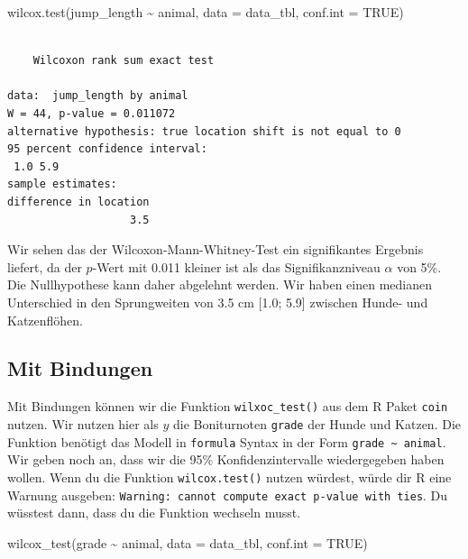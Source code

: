\documentclass[
  letterpaper,
]{scrbook}
\newenvironment{Shaded}{\begin{snugshade}}{\end{snugshade}}
\newcommand{\AttributeTok}[1]{\textcolor[rgb]{0.40,0.45,0.13}{#1}}
\newcommand{\ConstantTok}[1]{\textcolor[rgb]{0.56,0.35,0.01}{#1}}
\newcommand{\FunctionTok}[1]{\textcolor[rgb]{0.28,0.35,0.67}{#1}}
\newcommand{\NormalTok}[1]{\textcolor[rgb]{0.00,0.23,0.31}{#1}}
\newcommand{\SpecialCharTok}[1]{\textcolor[rgb]{0.37,0.37,0.37}{#1}}
\begin{document}
\begin{Shaded}
\begin{Highlighting}[]
\FunctionTok{wilcox.test}\NormalTok{(jump\_length }\SpecialCharTok{\textasciitilde{}}\NormalTok{ animal, }\AttributeTok{data =}\NormalTok{ data\_tbl, }
            \AttributeTok{conf.int =} \ConstantTok{TRUE}\NormalTok{)}
\end{Highlighting}
\end{Shaded}

\begin{verbatim}

    Wilcoxon rank sum exact test

data:  jump_length by animal
W = 44, p-value = 0.011072
alternative hypothesis: true location shift is not equal to 0
95 percent confidence interval:
 1.0 5.9
sample estimates:
difference in location 
                   3.5 
\end{verbatim}

Wir sehen das der Wilcoxon-Mann-Whitney-Test ein signifikantes Ergebnis
liefert, da der \(p\)-Wert mit 0.011 kleiner ist als das
Signifikanzniveau \(\alpha\) von 5\%. Die Nullhypothese kann daher
abgelehnt werden. Wir haben einen medianen Unterschied in den
Sprungweiten von 3.5 cm {[}1.0; 5.9{]} zwischen Hunde- und Katzenflöhen.

\hypertarget{mit-bindungen}{%
\subsection{Mit Bindungen}\label{mit-bindungen}}

Mit Bindungen können wir die Funktion \texttt{wilxoc\_test()} aus dem R
Paket \texttt{coin} nutzen. Wir nutzen hier als \(y\) die Boniturnoten
\texttt{grade} der Hunde und Katzen. Die Funktion benötigt das Modell in
\texttt{formula} Syntax in der Form
\texttt{grade\ \textasciitilde{}\ animal}. Wir geben noch an, dass wir
die 95\% Konfidenzintervalle wiedergegeben haben wollen. Wenn du die
Funktion \texttt{wilcox.test()} nutzen würdest, würde dir R eine Warnung
ausgeben:
\texttt{Warning:\ cannot\ compute\ exact\ p-value\ with\ ties}. Du
wüsstest dann, dass du die Funktion wechseln musst.

\begin{Shaded}
\begin{Highlighting}[]
\FunctionTok{wilcox\_test}\NormalTok{(grade }\SpecialCharTok{\textasciitilde{}}\NormalTok{ animal, }\AttributeTok{data =}\NormalTok{ data\_tbl, }
            \AttributeTok{conf.int =} \ConstantTok{TRUE}\NormalTok{) }
\end{Highlighting}
\end{Shaded}
\end{document}
